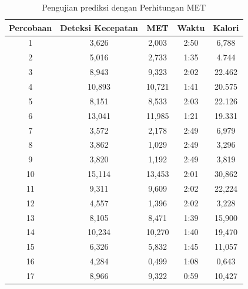 \begin{longtable}{|c|c|c|c|c|}
  \caption{Pengujian prediksi dengan Perhitungan MET}
  \label{tb:PengujianPrediksiPerhitungan}                                   \\
  \hline
  \rowcolor[HTML]{C0C0C0}
  \textbf{Percobaan} & \textbf{Deteksi Kecepatan} & \textbf{MET} & \textbf{Waktu} & \textbf{Kalori} \\
  \hline
  1   & 3,626   & 2,003    & 2:50    & 6,788   \\
  \hline
  2   & 5,016   & 2,733    & 1:35    & 4.744   \\
  \hline
  3   & 8,943   & 9,323    & 2:02    & 22.462  \\
  \hline
  4   & 10,893  & 10,721   & 1:41    & 20.575  \\
  \hline
  5   & 8,151   & 8,533    & 2:03    & 22.126  \\
  \hline
  6   & 13,041  & 11,985   & 1:21    & 19.331  \\
  \hline
  7   & 3,572   & 2,178    & 2:49    & 6,979  \\
  \hline
  8   & 3,862   & 1,029    & 2:49    & 3,296  \\
  \hline
  9   & 3,820   & 1,192    & 2:49    & 3,819  \\
  \hline
  10   & 15,114   & 13,453   & 2:01    & 30,862  \\
  \hline
  11   & 9,311   & 9,609   & 2:02    & 22,224  \\
  \hline
  12   & 4,557   & 1,396   & 2:02    & 3,228  \\
  \hline
  13   & 8,105   & 8,471   & 1:39    & 15,900  \\
  \hline
  14   & 10,234   & 10,270   & 1:40    & 19,470  \\
  \hline
  15   & 6,326   & 5,832   & 1:45    & 11,057  \\
  \hline
  16   & 4,284   & 0,499    & 1:08    & 0,643  \\
  \hline
  17   & 8,966   & 9,322   & 0:59    & 10,427  \\
  \hline
\end{longtable}


